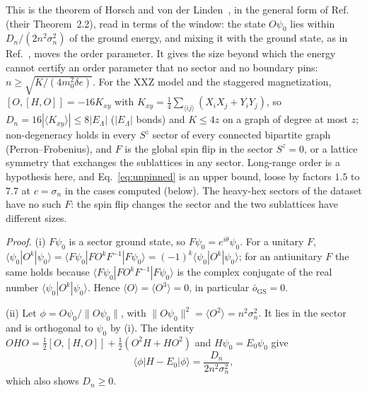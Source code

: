 \documentclass[aps,prx,onecolumn,10pt,nofootinbib,longbibliography,floatfix]{revtex4-2}
\theoremstyle{remark}
\newcommand{\de}{\delta e}
\newcommand{\GS}{\mathrm{GS}}
\begin{document}
This is the theorem of Horsch and von der Linden~\cite{horsch1988}, in the general form of
Ref.~\cite{koma1994} (their Theorem~2.2), read in terms of the window: the state $O\psi_0$ lies within %
$D_n/(2n^2\sigma_n^2)$ of the ground energy, and mixing it with the ground state, as in Ref.~\cite{koma1994}, moves
the order parameter. It gives the size beyond which the energy cannot certify an order parameter that no sector
and no boundary pins: $n\ge\sqrt{K/(4m_0^2\de)}$. For the XXZ model and the staggered magnetization,
$[O,[H,O]]=-16K_{xy}$ with $K_{xy}=\frac14\sum_{\langle ij\rangle}(X_iX_j+Y_iY_j)$, so %
$D_n=16|\langle K_{xy}\rangle|\le8|E_\Lambda|$ ($|E_\Lambda|$ bonds) and $K\le4z$ on a graph of degree at most %
$z$; non-degeneracy holds in every $S^z$ sector of every connected bipartite graph (Perron--Frobenius), and $F$
is the global spin flip in the sector $S^z=0$, or a lattice symmetry that exchanges the sublattices in any
sector. Long-range order is a hypothesis here, and Eq.~\eqref{eq:unpinned} is an upper bound, loose by factors
$1.5$ to $7.7$ at $c=\sigma_n$ in the cases computed (below). The heavy-hex sectors of the %
dataset have no such $F$: the spin flip changes the sector and the two sublattices have different sizes.

\emph{Proof.} (i) $F\psi_0$ is a sector ground state, so $F\psi_0=e^{i\theta}\psi_0$. For a unitary $F$,
$\langle\psi_0|O^k|\psi_0\rangle=\langle F\psi_0|FO^kF^{-1}|F\psi_0\rangle=(-1)^k\langle\psi_0|O^k|\psi_0\rangle$;
for an antiunitary $F$ the same holds because $\langle F\psi_0|FO^kF^{-1}|F\psi_0\rangle$ is the complex conjugate
of the real number $\langle\psi_0|O^k|\psi_0\rangle$. Hence $\langle O\rangle=\langle O^3\rangle=0$, in particular
$\bar o_\GS=0$.

(ii) Let $\phi=O\psi_0/\|O\psi_0\|$, with $\|O\psi_0\|^2=\langle O^2\rangle=n^2\sigma_n^2$. It lies in the sector
and is orthogonal to $\psi_0$ by (i). The identity $OHO=\frac12[O,[H,O]]+\frac12(O^2H+HO^2)$ and
$H\psi_0=E_0\psi_0$ give
\begin{equation}
\langle\phi|H-E_0|\phi\rangle=\frac{D_n}{2n^2\sigma_n^2}, %
\label{eq:hvdl}
\end{equation}
which also shows $D_n\ge0$.
\end{document}
